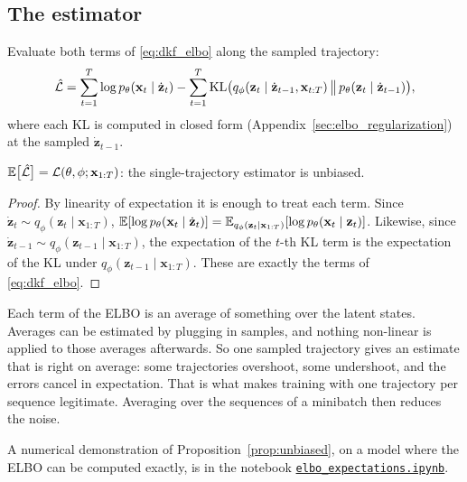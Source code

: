 \subsection{The estimator}

Evaluate both terms of \eqref{eq:dkf_elbo} along the sampled trajectory:
\begin{equation}
    \hat{\mathcal{L}} = \sum_{t=1}^T \log p_\theta(\mathbf{x}_t \mid
    \dot{\mathbf{z}}_t) - \sum_{t=1}^T \mathrm{KL}\big(q_\phi(\mathbf{z}_t \mid
    \dot{\mathbf{z}}_{t-1}, \mathbf{x}_{t:T}) \,\big\|\,
    p_\theta(\mathbf{z}_t \mid \dot{\mathbf{z}}_{t-1})\big),
    \label{eq:elbo_estimator}
\end{equation}
where each KL is computed in closed form
(Appendix~\ref{sec:elbo_regularization}) at the sampled
$\dot{\mathbf{z}}_{t-1}$.

\begin{proposition}\label{prop:unbiased}
$\mathbb{E}\big[\hat{\mathcal{L}}\big] = \mathcal{L}(\theta, \phi;
\mathbf{x}_{1:T})$: the single-trajectory estimator is unbiased.
\end{proposition}
\begin{proof}
By linearity of expectation it is enough to treat each term. Since
$\dot{\mathbf{z}}_t \sim q_\phi(\mathbf{z}_{t} \mid \mathbf{x}_{1:T})$,
$\mathbb{E}[\log p_\theta(\mathbf{x}_t \mid \dot{\mathbf{z}}_t)] =
\mathbb{E}_{q_\phi(\mathbf{z}_{t} \mid \mathbf{x}_{1:T})}[\log
p_\theta(\mathbf{x}_t \mid \mathbf{z}_t)]$. Likewise, since
$\dot{\mathbf{z}}_{t-1} \sim q_\phi(\mathbf{z}_{t-1} \mid
\mathbf{x}_{1:T})$, the expectation of the $t$-th KL term is the
expectation of the KL under $q_\phi(\mathbf{z}_{t-1} \mid
\mathbf{x}_{1:T})$. These are exactly the terms of \eqref{eq:dkf_elbo}.
\end{proof}

\begin{inwords}
Each term of the ELBO is an average of something over the latent states.
Averages can be estimated by plugging in samples, and nothing non-linear
is applied to those averages afterwards. So one sampled trajectory gives
an estimate that is right on average: some trajectories overshoot, some
undershoot, and the errors cancel in expectation. That is what makes
training with one trajectory per sequence legitimate. Averaging over the
sequences of a minibatch then reduces the noise.
\end{inwords}

A numerical demonstration of Proposition~\ref{prop:unbiased}, on a
model where the ELBO can be computed exactly, is in the notebook
\href{https://github.com/CL-BZH/Deep-Kalman-Filters/blob/main/Notebooks/elbo_expectations.ipynb}{\texttt{elbo\_expectations.ipynb}}.


